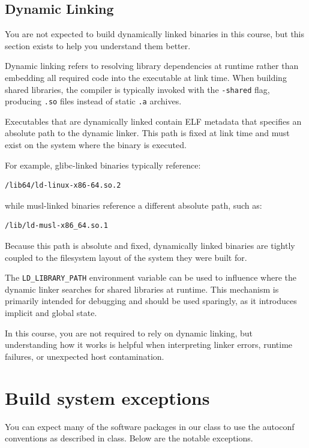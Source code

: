 \documentclass{../juni}
\begin{document}
\subsection{Dynamic Linking}

You are not expected to build dynamically linked binaries in this course, but
this section exists to help you understand them better.

Dynamic linking refers to resolving library dependencies at runtime rather than
embedding all required code into the executable at link time. When building
shared libraries, the compiler is typically invoked with the \texttt{-shared}
flag, producing \texttt{.so} files instead of static \texttt{.a} archives.

Executables that are dynamically linked contain ELF metadata that specifies an
absolute path to the dynamic linker. This path is fixed at link time and must
exist on the system where the binary is executed.

For example, glibc-linked binaries typically reference:

\begin{verbatim}
/lib64/ld-linux-x86-64.so.2
\end{verbatim}

while musl-linked binaries reference a different absolute path, such as:

\begin{verbatim}
/lib/ld-musl-x86_64.so.1
\end{verbatim}

Because this path is absolute and fixed, dynamically linked binaries are tightly
coupled to the filesystem layout of the system they were built for.

The \texttt{LD\_LIBRARY\_PATH} environment variable can be used to influence where
the dynamic linker searches for shared libraries at runtime. This mechanism is
primarily intended for debugging and should be used sparingly, as it introduces
implicit and global state.

In this course, you are not required to rely on dynamic linking, but understanding
how it works is helpful when interpreting linker errors, runtime failures, or
unexpected host contamination.

\newpage
\section{Build system exceptions}

You can expect many of the software packages in our class to use the autoconf
conventions as described in class. Below are the notable exceptions.
\end{document}
